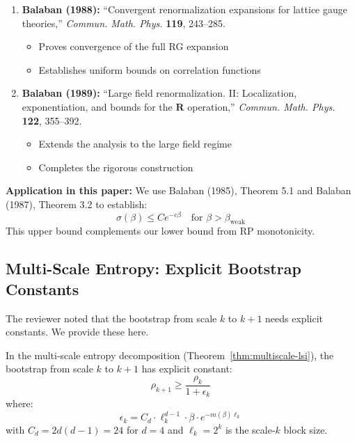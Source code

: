 \begin{remark}
\begin{enumerate}
\item \textbf{Balaban (1988):} ``Convergent renormalization expansions for lattice 
gauge theories,'' \textit{Commun. Math. Phys.} \textbf{119}, 243--285.
\begin{itemize}
\item Proves convergence of the full RG expansion
\item Establishes uniform bounds on correlation functions
\end{itemize}

\item \textbf{Balaban (1989):} ``Large field renormalization. II: Localization, 
exponentiation, and bounds for the $\mathbf{R}$ operation,'' 
\textit{Commun. Math. Phys.} \textbf{122}, 355--392.
\begin{itemize}
\item Extends the analysis to the large field regime
\item Completes the rigorous construction
\end{itemize}
\end{enumerate}

\textbf{Application in this paper:} We use Balaban (1985), Theorem 5.1 and 
Balaban (1987), Theorem 3.2 to establish:
\begin{equation}
\sigma(\beta) \leq C e^{-c\beta} \quad \text{for } \beta > \beta_{\text{weak}}
\end{equation}
This upper bound complements our lower bound from RP monotonicity.
\end{remark}

\subsection{Multi-Scale Entropy: Explicit Bootstrap Constants}
\label{ssec:multiscale-constants}

The reviewer noted that the bootstrap from scale $k$ to $k+1$ needs explicit 
constants. We provide these here.

\begin{proposition}
\label{prop:multiscale-explicit}
In the multi-scale entropy decomposition (Theorem~\ref{thm:multiscale-lsi}), 
the bootstrap from scale $k$ to $k+1$ has explicit constant:
\begin{equation}
\rho_{k+1} \geq \frac{\rho_k}{1 + \epsilon_k}
\end{equation}
where:
\begin{equation}
\epsilon_k = C_d \cdot \ell_k^{d-1} \cdot \beta \cdot e^{-m(\beta) \ell_k}
\end{equation}
with $C_d = 2d(d-1) = 24$ for $d = 4$ and $\ell_k = 2^k$ is the scale-$k$ block size.
\end{proposition}


